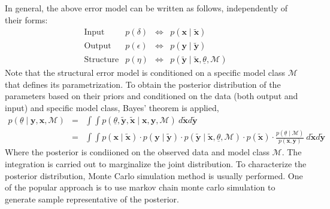 \documentclass[11pt,titlepage]{article}
\begin{document}
In general, the above error model can be written as follows, independently of their forms:
\begin{equation}
\begin{array}{lrcr} 
	\text{Input} 	& p(\delta)	 	& \iff & p(\mathbf{x} \mid \mathbf{\tilde{x}}) \\ 
	\text{Output} 	& p(\epsilon) 	& \iff & p(\mathbf{y} \mid \mathbf{\tilde{y}}) \\
	\text{Structure}	& p(\eta) 		& \iff & p(\mathbf{\tilde{y}} \mid \mathbf{\tilde{x}}, \underline{\theta}, \mathcal{M}) 
\end{array}
\nonumber
\end{equation}
Note that the structural error model is conditioned on a specific model class $\mathcal{M}$ that defines its parametrization. To obtain the posterior distribution of the parameters based on their priors and conditioned on the data (both output and input) and specific model class, Bayes' theorem is applied,
\begin{equation}
\begin{array}{rcl} 
	p(\underline{\theta} \mid \mathbf{y}, \mathbf{x}, \mathcal{M} )	& = & \int \int p(\underline{\theta}, \mathbf{\tilde{y}}, \mathbf{\tilde{x}} \mid \mathbf{x}, \mathbf{y}, \mathcal{M} ) \: d\mathbf{\tilde{x}} d\mathbf{\tilde{y}} \\ 
		& = & \int \int p(\mathbf{x} \mid \mathbf{\tilde{x}}) \cdot p(\mathbf{y} \mid \mathbf{\tilde{y}}) \cdot p(\mathbf{\tilde{y}} \mid \mathbf{\tilde{x}}, \underline{\theta}, \mathcal{M} ) \cdot p(\mathbf{\tilde{x}}) \cdot \frac{p(\underline{\theta} \mid \mathcal{M})}{p(\mathbf{x}, \mathbf{y})} \: d\mathbf{\tilde{x}} d\mathbf{\tilde{y}}
\end{array}
\nonumber
\end{equation}
Where the posterior is condiioned on the observed data and model class $\mathcal{M}$. The integration is carried out to marginalize the joint distribution. To characterize the posterior distribution, Monte Carlo simulation method is usually performed. One of the popular approach is to use markov chain monte carlo simulation to generate sample representative of the posterior.
\end{document}

